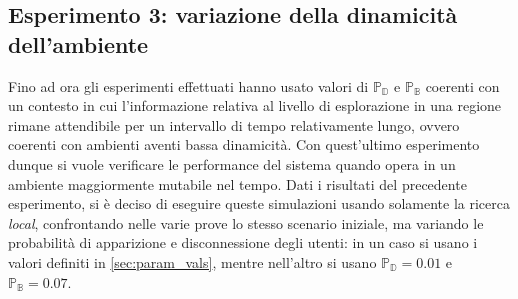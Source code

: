 \subsection{Esperimento 3: variazione della dinamicità dell'ambiente}\label{subsec:exp3}
Fino ad ora gli esperimenti effettuati hanno usato valori di $\mathbb{P_D}$ e $\mathbb{P_B}$ coerenti con un contesto in cui l'informazione relativa al livello di esplorazione in una regione rimane attendibile per un intervallo di tempo relativamente lungo, ovvero coerenti con ambienti aventi bassa dinamicità. 
Con quest'ultimo esperimento dunque si vuole verificare le performance del sistema quando opera in un ambiente maggiormente mutabile nel tempo.
Dati i risultati del precedente esperimento, si è deciso di eseguire queste simulazioni usando solamente la ricerca \textit{local}, confrontando nelle varie prove lo stesso scenario iniziale, ma variando le probabilità di apparizione e disconnessione degli utenti: in un caso si usano i valori definiti in \ref{sec:param_vals}, mentre nell'altro si usano $\mathbb{P_D}=0.01$ e $\mathbb{P_B}=0.07$.

